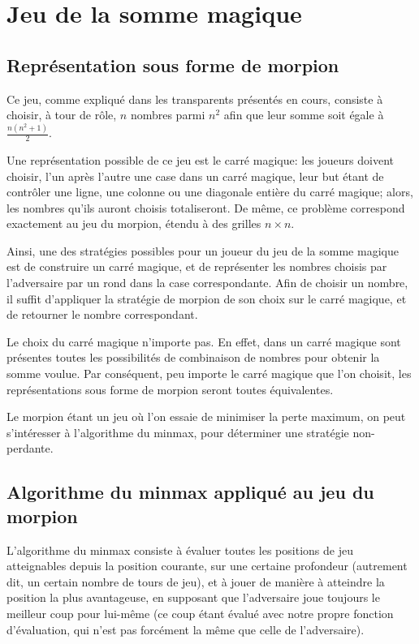 \section{Jeu de la somme magique}

\subsection{Représentation sous forme de morpion}
Ce jeu, comme expliqué dans les transparents présentés en cours,
consiste à choisir, à tour de rôle, $n$ nombres parmi $n^2$ afin que
leur somme soit égale à $\frac{n(n^2+1)}{2}$.

Une représentation possible de ce jeu est le carré magique: les
joueurs doivent choisir, l'un après l'autre une case dans un carré
magique, leur but étant de contrôler une ligne, une colonne ou une
diagonale entière du carré magique; alors, les nombres qu'ils auront
choisis totaliseront.  De même, ce problème correspond exactement au
jeu du morpion, étendu à des grilles $n \times n$.

Ainsi, une des stratégies possibles pour un joueur du jeu de la somme
magique est de construire un carré magique, et de représenter les
nombres choisis par l'adversaire par un rond dans la case
correspondante. Afin de choisir un nombre, il suffit d'appliquer la
stratégie de morpion de son choix sur le carré magique, et de
retourner le nombre correspondant.

Le choix du carré magique n'importe pas. En effet, dans un carré
magique sont présentes toutes les possibilités de combinaison de
nombres pour obtenir la somme voulue. Par conséquent, peu importe le
carré magique que l'on choisit, les représentations sous forme de
morpion seront toutes équivalentes.

Le morpion étant un jeu où l'on essaie de minimiser la perte maximum,
on peut s'intéresser à l'algorithme du minmax, pour déterminer une
stratégie non-perdante.

\subsection{Algorithme du minmax appliqué au jeu du morpion}
L'algorithme du minmax consiste à évaluer toutes les positions de jeu
atteignables depuis la position courante, sur une certaine profondeur
(autrement dit, un certain nombre de tours de jeu), et à jouer de
manière à atteindre la position la plus avantageuse, en supposant que
l'adversaire joue toujours le meilleur coup pour lui-même (ce coup
étant évalué avec notre propre fonction d'évaluation, qui n'est pas
forcément la même que celle de l'adversaire).

